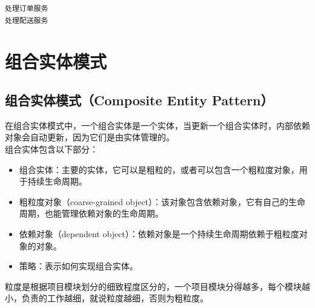 \begin{tcolorbox}
    \begin{verbatim}
处理订单服务
处理配送服务
\end{verbatim}
\end{tcolorbox}

\newpage

\section{组合实体模式}

\subsection{组合实体模式（Composite Entity Pattern）}

在组合实体模式中，一个组合实体是一个实体，当更新一个组合实体时，内部依赖对象会自动更新，因为它们是由实体管理的。\\

组合实体包含以下部分：

\begin{itemize}
    \item 组合实体：主要的实体，它可以是粗粒的，或者可以包含一个粗粒度对象，用于持续生命周期。

    \item 粗粒度对象（coarse-grained object）：该对象包含依赖对象，它有自己的生命周期，也能管理依赖对象的生命周期。

    \item 依赖对象（dependent object）：依赖对象是一个持续生命周期依赖于粗粒度对象的对象。

    \item 策略：表示如何实现组合实体。
\end{itemize}

粒度是根据项目模块划分的细致程度区分的，一个项目模块分得越多，每个模块越小，负责的工作越细，就说粒度越细，否则为粗粒度。\\

\\

